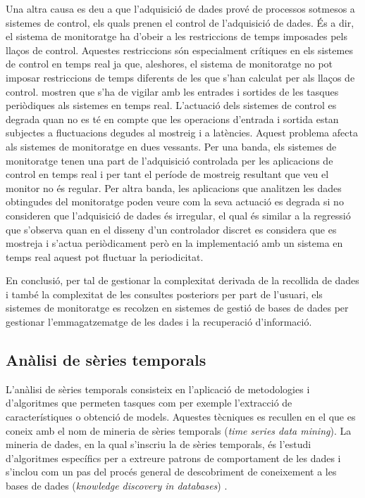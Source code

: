 \begin{enumerate}
Una altra causa es deu a que l'adquisició de dades prové de processos sotmesos a sistemes de control, els quals prenen el control de l'adquisició de dades. És a dir, el sistema de monitoratge ha d'obeir a les restriccions de temps imposades pels llaços de control. Aquestes restriccions són especialment crítiques en els sistemes de control en temps real ja que, aleshores, el sistema de monitoratge no pot imposar restriccions de temps diferents de les que s'han calculat per als llaços de control.  \textcite{lozoya08} mostren que s'ha de vigilar amb les entrades i sortides de les tasques periòdiques als sistemes en temps real. L'actuació dels sistemes de control es degrada quan no es té en compte que les operacions d'entrada i sortida estan subjectes a fluctuacions degudes al mostreig i a latències. Aquest problema afecta als sistemes de monitoratge en dues vessants.
Per una banda, els sistemes de monitoratge tenen una part de l'adquisició controlada per les aplicacions de control en temps real i per tant el període de mostreig resultant que veu el monitor no és regular. 
Per altra banda, les aplicacions que analitzen les dades obtingudes del monitoratge poden veure com la seva actuació es degrada si no consideren que l'adquisició de dades és irregular, el qual és similar a la regressió que s'observa \parencite{lozoya08} quan en el disseny d'un controlador discret es considera que es mostreja i s'actua periòdicament però en la implementació amb un sistema en temps real aquest pot fluctuar la periodicitat.

\end{enumerate}



En conclusió, per tal de gestionar la complexitat derivada de la recollida de dades i també la complexitat de les consultes posteriors per part de l'usuari, els sistemes de monitoratge es recolzen en sistemes de gestió de bases de dades per gestionar l'emmagatzematge de les dades i la recuperació d'informació.





\subsection{Anàlisi de sèries temporals}

L'anàlisi de sèries temporals consisteix en l'aplicació de
metodologies i d'algoritmes que permeten tasques com per exemple
l'extracció de característiques o obtenció de models.  Aquestes
tècniques es recullen en el que es coneix amb el nom de mineria de
sèries temporals (\emph{time series data mining}). La mineria de
dades, en la qual s'inscriu la de sèries temporals, és l'estudi
d'algoritmes específics per a extreure patrons de comportament de les
dades i s'inclou com un pas del procés general de descobriment de
coneixement a les bases de dades (\emph{knowledge discovery in
  databases}) \parencite{fayyad96,last01}.

